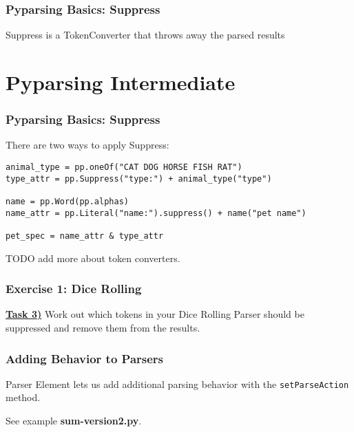 \documentclass{beamer}
\begin{document}
\begin{frame}
\frametitle{Pyparsing Basics: Suppress}
Suppress is a TokenConverter that throws away the parsed results
\begin{center}
\end{center}

\end{frame}

\section{Pyparsing Intermediate}

\begin{frame}[fragile]
\frametitle{Pyparsing Basics: Suppress}
There are two ways to apply Suppress:
\begin{verbatim}
animal_type = pp.oneOf("CAT DOG HORSE FISH RAT")
type_attr = pp.Suppress("type:") + animal_type("type")

name = pp.Word(pp.alphas)
name_attr = pp.Literal("name:").suppress() + name("pet name")

pet_spec = name_attr & type_attr
\end{verbatim}
\end{frame}

\begin{frame}
TODO add more about token converters.
\end{frame}


\begin{frame}
\frametitle{Exercise 1: Dice Rolling}
\textbf{\underline{Task 3)}} Work out which tokens in your Dice Rolling Parser should be suppressed and remove them from the results. \\
\end{frame}





\begin{frame}
\frametitle{Adding Behavior to Parsers}
Parser Element lets us add additional parsing behavior with the \texttt{setParseAction} method.
\medskip

See example \textbf{sum-version2.py}.

\end{frame}
\end{document}

